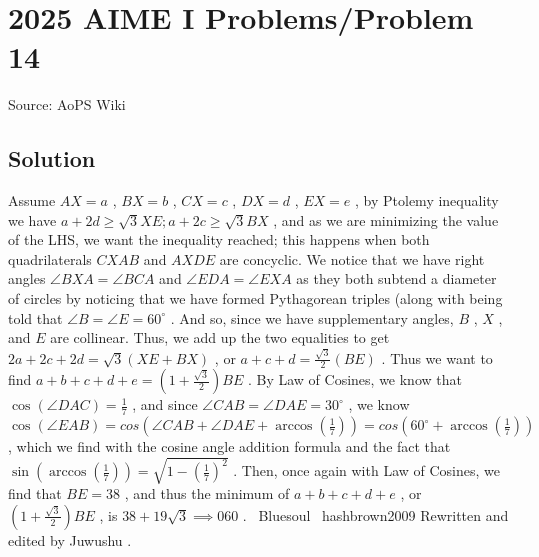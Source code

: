 \documentclass[12pt]{article}
\begin{document}
\section*{{2025 AIME I Problems/Problem 14}}
Source: AoPS Wiki

\subsection*{Solution}
Assume $AX=a$ , $BX=b$ , $CX=c$ , $DX=d$ , $EX=e$ , by Ptolemy inequality we have $a+2d\geq \sqrt{3}XE; a+2c\geq \sqrt{3}BX$ , and as we are minimizing the value of the LHS, we want the inequality reached; this happens when both quadrilaterals $CXAB$ and $AXDE$ are concyclic. We notice that we have right angles $\angle{BXA}=\angle{BCA}$ and $\angle{EDA}=\angle{EXA}$ as they both subtend a diameter of circles by noticing that we have formed Pythagorean triples (along with being told that $\angle{B}=\angle{E}=60^{\circ}$ . And so, since we have supplementary angles, $B$ , $X$ , and $E$ are collinear. Thus, we add up the two equalities to get $2a+2c+2d=\sqrt{3}(XE+BX)$ , or $a+c+d=\frac{\sqrt{3}}{2}(BE)$ . Thus we want to find $a+b+c+d+e=(1+\frac{\sqrt{3}}{2})BE$ . By Law of Cosines, we know that $\cos(\angle{DAC})=\frac{1}{7}$ , and since $\angle{CAB}=\angle{DAE}=30^{\circ}$ , we know $\cos(\angle{EAB})=cos(\angle{CAB}+\angle{DAE}+\arccos(\frac{1}{7}))=cos(60^{\circ}+\arccos(\frac{1}{7}))$ , which we find with the cosine angle addition formula and the fact that $\sin(\arccos(\frac{1}{7}))=\sqrt{1-(\frac{1}{7})^2}$ . Then, once again with Law of Cosines, we find that $BE=38$ , and thus the minimum of $a+b+c+d+e$ , or $(1+\frac{\sqrt{3}}{2})BE$ , is $38+19\sqrt{3}\implies\boxed{060}$ . ~Bluesoul ~hashbrown2009 Rewritten and edited by Juwushu .
\end{document}
